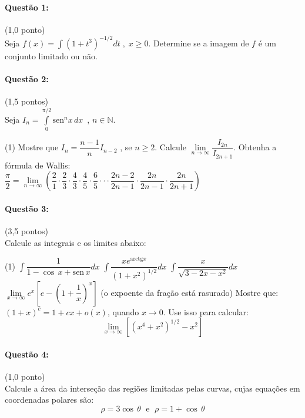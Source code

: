 \documentclass[12pt,a4paper]{article}
\begin{document}
\paragraph{Questão 1:}(1,0 ponto)\\
Seja $f(x)=\displaystyle\int(1+t^3)^{-1/2}dt\;,\;x\geq 0$. Determine se a imagem de $f$ é um conjunto limitado ou não.

\paragraph{Questão 2:}(1,5 pontos)\\
Seja $I_n=\displaystyle\int\limits_{0}^{\pi/2}\mathrm{sen}^nx\,dx\,$ , $n \in \mathbb{N}$. 

\begin{tasks}(1)
\task Mostre que $I_n=\dfrac{n-1}{n}I_{n-2}$ , se $n\geq 2$.
\task Calcule $\lim\limits_{n\to \infty}\dfrac{I_{2n}}{I_{2n+1}}.$
\task Obtenha a fórmula de Wallis:\\
$\dfrac{\pi}{2}=\lim\limits_{n\to \infty}\left(\dfrac{2}{1}\cdot\dfrac{2}{3}\cdot\dfrac{4}{3}\cdot\dfrac{4}{5}\cdot\dfrac{6}{5}\cdot\cdot\cdot\dfrac{2n-2}{2n-1}\cdot\dfrac{2n}{2n-1}\cdot\dfrac{2n}{2n+1}\right)$
\end{tasks}

\paragraph{Questão 3:}(3,5 pontos)\\
Calcule as integrais e os limites abaixo:

\begin{tasks}(1)
\task $\displaystyle\int \dfrac{1}{1-\cos\,x+\mathrm{sen}\,x}dx$
\task $\displaystyle\int \dfrac{xe^{\mathrm{arctg}x}}{(1+x^2)^{1/2}}dx$
\task $\displaystyle\int \dfrac{x}{\sqrt{3-2x-x^2}}dx$
\task $\lim\limits_{x\to \infty}e^x\left[e-\left(1+\dfrac{1}{x}\right)^{x}\right ]$ (o expoente da fração está rasurado)
\task Mostre que: $(1+x)^c=1+cx+o(x)$, quando $x\to 0$. Use isso para calcular:
$$\lim\limits_{x\to \infty}[(x^4+x^2)^{1/2}-x^2]$$

\end{tasks}

\paragraph{Questão 4:}(1,0 ponto)\\
Calcule a área da interseção das regiões limitadas pelas curvas, cujas equações em coordenadas polares são:
$$\rho=3\cos\,\theta\;\text{ e }\;\rho=1+\cos\,\theta$$
\end{document}
